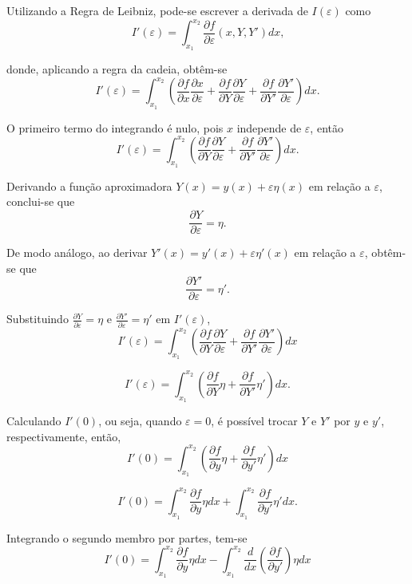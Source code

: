 \documentclass{beamer}
\newif\ifcompilepause
\newcommand{\cpause}{
	\ifcompilepause
	\pause
	\fi
}
\begin{document}
	\begin{frame}
		\justify
	
		Utilizando a Regra de Leibniz, pode-se escrever a derivada de $I(\varepsilon)$ como
		$$I'(\varepsilon)=\int_{x_1}^{x_2} \frac{\partial f}{\partial \varepsilon} (x, Y, Y') dx \text{,}$$
		\cpause
		donde, aplicando a regra da cadeia, obtêm-se
		$$I'(\varepsilon)=\int_{x_1}^{x_2}\left ( \frac{\partial f}{\partial x}\frac{\partial x}{\partial \varepsilon} + \frac{\partial f}{\partial Y} \frac{\partial Y}{\partial \varepsilon} + \frac{\partial f}{\partial Y'} \frac{\partial Y'}{\partial \varepsilon} \right )dx\text{.}$$
		\cpause
	
		O primeiro termo do integrando é nulo, pois $x$ independe de $\varepsilon$, então
		$$
			I'(\varepsilon)=\int_{x_1}^{x_2}\left ( \frac{\partial f}{\partial Y}\frac{\partial Y}{\partial \varepsilon} + \frac{\partial f}{\partial Y'}\frac{\partial Y'}{\partial \varepsilon} \right ) dx \text{.}
		$$
	\end{frame}

	\begin{frame}
		\justify
	
		Derivando a função aproximadora $Y(x)=y(x)+\varepsilon \eta(x)$ em relação a $\varepsilon$, conclui-se que
		$$\frac{\partial Y}{\partial \varepsilon}=\eta\text{.}$$
		\cpause
	
		De modo análogo, ao derivar $Y'(x)=y'(x)+\varepsilon \eta '(x)$ em relação a $\varepsilon$, obtêm-se que
		$$\frac{\partial Y'}{\partial \varepsilon}=\eta '\text{.}$$
	\end{frame}

	\begin{frame}
		\justify
	
		Substituindo $\frac{\partial Y}{\partial \varepsilon}=\eta$ e $\frac{\partial Y'}{\partial \varepsilon}=\eta'$ em $I'(\varepsilon)$,
		$$
			I'(\varepsilon)=\int_{x_1}^{x_2}\left ( \frac{\partial f}{\partial Y}\frac{\partial Y}{\partial \varepsilon} + \frac{\partial f}{\partial Y'}\frac{\partial Y'}{\partial \varepsilon} \right ) dx
		$$
		\cpause
		$$
			I'(\varepsilon)=\int_{x_1}^{x_2}\left ( 
				\frac{\partial f}{\partial Y} \eta +
				\frac{\partial f}{\partial Y'} \eta '
			\right )dx \text{.}
		$$
	\end{frame}

	\begin{frame}
		\justify
	
		Calculando $I'(0)$, ou seja, quando $\varepsilon=0$, é possível trocar $Y$ e $Y'$ por $y$ e $y'$, respectivamente, então,
		$$
			I'(0)=\int_{x_1}^{x_2}\left (
				\frac{\partial f}{\partial y} \eta +
				\frac{\partial f}{\partial y'} \eta '
			\right )dx
		$$
		\cpause
		$$
			I'(0)=
				\int_{x_1}^{x_2} \frac{\partial f}{\partial y}\eta dx
				+
				\int_{x_1}^{x_2} \frac{\partial f}{\partial y'}\eta' dx \text{.}
		$$
		\cpause
	
		Integrando o segundo membro por partes, tem-se
		$$
		I'(0)=
			\int_{x_1}^{x_2} \frac{\partial f}{\partial y}\eta dx
			-
			\int_{x_1}^{x_2} \frac{d}{dx} \left ( \frac{\partial f}{\partial y'} \right ) \eta dx
		$$
	\end{frame}
	
\end{document}
